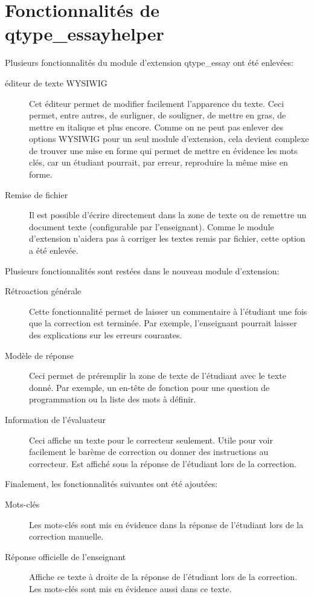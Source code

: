 \section{Fonctionnalit\'es de qtype\_essayhelper}
Plusieurs fonctionnalit\'es du module d'extension \og qtype\_essay \fg{} ont \'et\'e enlev\'ees:
\begin{description}
  \item[\'editeur de texte WYSIWIG]
  
  Cet \'editeur permet de modifier facilement l'apparence du texte.
  Ceci permet, entre autres, de surligner, de souligner, de mettre en gras, de mettre en italique et plus encore.
  Comme on ne peut pas enlever des options WYSIWIG pour un seul module d'extension, cela devient complexe de trouver une mise en forme qui permet de mettre en \'evidence les mots cl\'es, car un \'etudiant pourrait, par erreur, reproduire la m\^eme mise en forme.
  
  \item[Remise de fichier]
  
  Il est possible d'\'ecrire directement dans la zone de texte ou de remettre un document texte (configurable par l'enseignant).
  Comme le module d'extension n'aidera pas \`a corriger les textes remis par fichier, cette option a \'et\'e enlev\'ee.
\end{description}
Plusieurs fonctionnalit\'es sont rest\'ees dans le nouveau module d'extension:
\begin{description}
  \item[R\'etroaction g\'en\'erale]
  
  Cette fonctionnalit\'e permet de laisser un commentaire \`a l'\'etudiant une fois que la correction est termin\'ee.
  Par exemple, l'enseignant pourrait laisser des explications sur les erreurs courantes.
  
  \item[Mod\`ele de r\'eponse]
  
  Ceci permet de pr\'eremplir la zone de texte de l'\'etudiant avec le texte donn\'e.
  Par exemple, un en-t\^ete de fonction pour une question de programmation ou la liste des mots \`a d\'efinir.
  
  \item[Information de l'\'evaluateur]
  
  Ceci affiche un texte pour le correcteur seulement.
  Utile pour voir facilement le bar\`eme de correction ou donner des instructions au correcteur.
  Est affich\'e sous la r\'eponse de l'\'etudiant lors de la correction.
\end{description}
Finalement, les fonctionnalit\'es suivantes ont \'et\'e ajout\'ees:
\begin{description}
  \item[Mots-cl\'es]
  
  Les mots-cl\'es sont mis en \'evidence dans la r\'eponse de l'\'etudiant lors de la correction manuelle.
  \item[R\'eponse officielle de l'enseignant]
  
  Affiche ce texte \`a droite de la r\'eponse de l'\'etudiant lors de la correction.
  Les mots-cl\'es sont mis en \'evidence aussi dans ce texte.
\end{description}
